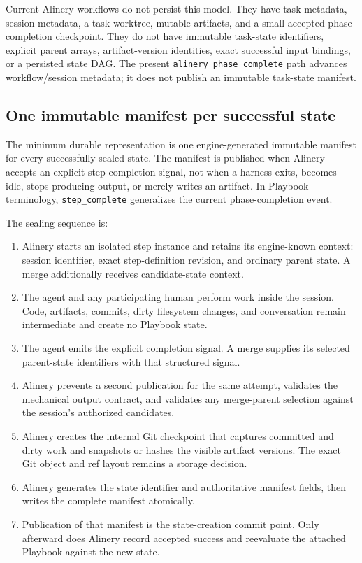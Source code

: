 \documentclass[11pt]{article}
\begin{document}
\begin{warningbox}
Current Alinery workflows do not persist this model. They have task metadata, session metadata, a task worktree, mutable artifacts, and a small accepted phase-completion checkpoint. They do not have immutable task-state identifiers, explicit parent arrays, artifact-version identities, exact successful input bindings, or a persisted state DAG. The present \texttt{alinery\_phase\_complete} path advances workflow/session metadata; it does not publish an immutable task-state manifest.
\end{warningbox}

\subsection{One immutable manifest per successful state}

The minimum durable representation is one engine-generated immutable manifest for every successfully sealed state. The manifest is published when Alinery accepts an explicit step-completion signal, not when a harness exits, becomes idle, stops producing output, or merely writes an artifact. In Playbook terminology, \texttt{step\_complete} generalizes the current phase-completion event.

The sealing sequence is:

\begin{enumerate}
  \item Alinery starts an isolated step instance and retains its engine-known context: session identifier, exact step-definition revision, and ordinary parent state. A merge additionally receives candidate-state context.
  \item The agent and any participating human perform work inside the session. Code, artifacts, commits, dirty filesystem changes, and conversation remain intermediate and create no Playbook state.
  \item The agent emits the explicit completion signal. A merge supplies its selected parent-state identifiers with that structured signal.
  \item Alinery prevents a second publication for the same attempt, validates the mechanical output contract, and validates any merge-parent selection against the session's authorized candidates.
  \item Alinery creates the internal Git checkpoint that captures committed and dirty work and snapshots or hashes the visible artifact versions. The exact Git object and ref layout remains a storage decision.
  \item Alinery generates the state identifier and authoritative manifest fields, then writes the complete manifest atomically.
  \item Publication of that manifest is the state-creation commit point. Only afterward does Alinery record accepted success and reevaluate the attached Playbook against the new state.
\end{enumerate}
\end{document}
